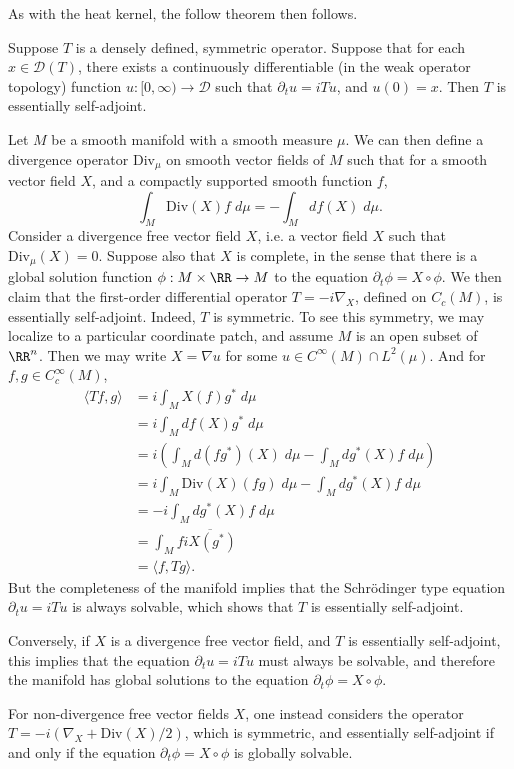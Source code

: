 As with the heat kernel, the follow theorem then follows.

\begin{theorem}
    Suppose $T$ is a densely defined, symmetric operator. Suppose that for each $x \in \mathcal{D}(T)$, there exists a continuously differentiable (in the weak operator topology) function $u: [0,\infty) \to \mathcal{D}$ such that $\partial_t u = i Tu$, and $u(0) = x$. Then $T$ is essentially self-adjoint.
\end{theorem}

\begin{example}
    Let $M$ be a smooth manifold with a smooth measure $\mu$. We can then define a divergence operator $\text{Div}_\mu$ on smooth vector fields of $M$ such that for a smooth vector field $X$, and a compactly supported smooth function $f$,
    \[ \int_M \text{Div}(X) f\; d\mu = - \int_M df(X)\; d\mu. \]
    Consider a divergence free vector field $X$, i.e. a vector field $X$ such that $\text{Div}_\mu(X) = 0$. Suppose also that $X$ is complete, in the sense that there is a global solution function $\phi: M \times \RR \to M$ to the equation $\partial_t \phi = X \circ \phi$. We then claim that the first-order differential operator $T = - i \nabla_X$, defined on $C_c(M)$, is essentially self-adjoint. Indeed, $T$ is symmetric. To see this symmetry, we may localize to a particular coordinate patch, and assume $M$ is an open subset of $\RR^n$. Then we may write $X = \nabla u$ for some $u \in C^\infty(M) \cap L^2(\mu)$. And for $f,g \in C_c^\infty(M)$,
    \begin{align*}
        \langle Tf, g \rangle &= i \int_M X(f) g^*\; d\mu\\
        &= i \int_M df(X) g^*\; d\mu\\
        &= i \left( \int_M d(fg^*)(X)\; d\mu - \int_M dg^*(X) f\; d\mu \right)\\
        &= i \int_M \text{Div}(X) (fg)\; d\mu - \int_M dg^*(X) f\; d\mu\\
        &= - i \int_M dg^*(X) f\; d\mu\\
        &= \int_M f \overline{i X(g^*)}\\
        &= \langle f, Tg \rangle.
    \end{align*}
    But the completeness of the manifold implies that the Schr\"{o}dinger type equation $\partial_t u = i Tu$ is always solvable, which shows that $T$ is essentially self-adjoint.

    Conversely, if $X$ is a divergence free vector field, and $T$ is essentially self-adjoint, this implies that the equation $\partial_t u = i Tu$ must always be solvable, and therefore the manifold has global solutions to the equation $\partial_t \phi = X \circ \phi$.

    For non-divergence free vector fields $X$, one instead considers the operator $T = -i ( \nabla_X + \text{Div}(X) / 2)$, which is symmetric, and essentially self-adjoint if and only if the equation $\partial_t \phi = X \circ \phi$ is globally solvable.
\end{example}


